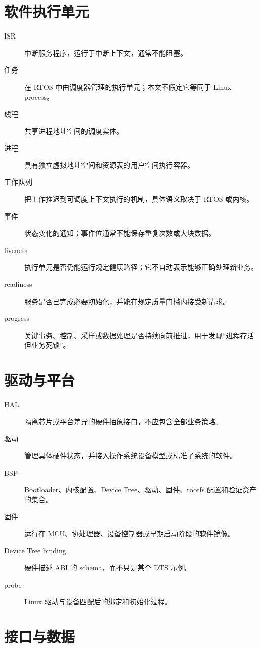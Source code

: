 \section{软件执行单元}

\begin{description}
  \item[ISR] 中断服务程序，运行于中断上下文，通常不能阻塞。
  \item[任务] 在 RTOS 中由调度器管理的执行单元；本文不假定它等同于 Linux process。
  \item[线程] 共享进程地址空间的调度实体。
  \item[进程] 具有独立虚拟地址空间和资源表的用户空间执行容器。
  \item[工作队列] 把工作推迟到可调度上下文执行的机制，具体语义取决于 RTOS 或内核。
  \item[事件] 状态变化的通知；事件位通常不能保存重复次数或大块数据。
  \item[liveness] 执行单元是否仍能运行规定健康路径；它不自动表示能够正确处理新业务。
  \item[readiness] 服务是否已完成必要初始化，并能在规定质量门槛内接受新请求。
  \item[progress] 关键事务、控制、采样或数据处理是否持续向前推进，用于发现“进程存活但业务死锁”。
\end{description}

\section{驱动与平台}

\begin{description}
  \item[HAL] 隔离芯片或平台差异的硬件抽象接口，不应包含全部业务策略。
  \item[驱动] 管理具体硬件状态，并接入操作系统设备模型或标准子系统的软件。
  \item[BSP] Bootloader、内核配置、Device Tree、驱动、固件、rootfs 配置和验证资产的集合。
  \item[固件] 运行在 MCU、协处理器、设备控制器或早期启动阶段的软件镜像。
  \item[Device Tree binding] 硬件描述 ABI 的 schema，而不只是某个 DTS 示例。
  \item[probe] Linux 驱动与设备匹配后的绑定和初始化过程。
\end{description}

\section{接口与数据}


